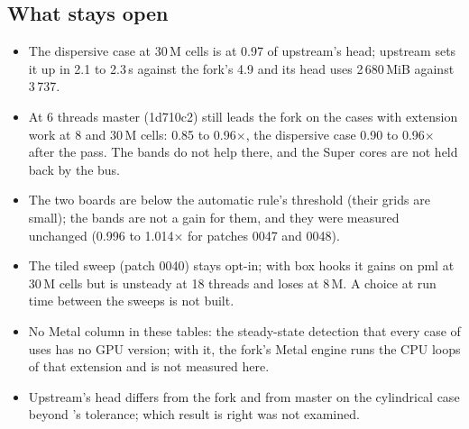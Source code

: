 \subsection{What stays open}
\begin{itemize}
\item The dispersive case at 30\,M cells is at 0.97 of upstream's head; upstream sets it up in 2.1 to 2.3\,s against the fork's 4.9 and its head
  uses 2\,680\,MiB against 3\,737.
\item At 6 threads master (1d710c2) still leads the fork on the cases with extension work at 8 and 30\,M cells: 0.85 to
  0.96$\times$, the dispersive case 0.90 to 0.96$\times$ after the pass. The bands do not help there, and the Super cores are not
  held back by the bus.
\item The two boards are below the automatic rule's threshold (their grids are small); the bands are not a gain for them, and
  they were measured unchanged (0.996 to 1.014$\times$ for patches 0047 and 0048).
\item The tiled sweep (patch 0040) stays opt-in; with box hooks it gains on pml at 30\,M cells but is unsteady at 18 threads and loses at 8\,M. A choice at run time between the sweeps is not built.
\item No Metal column in these tables: the steady-state detection that every case of  uses has no GPU version; with
  it, the fork's Metal engine runs the CPU loops of that extension and is not measured here.
\item Upstream's head differs from the fork and from master on the cylindrical case beyond 's tolerance;
  which result is right was not examined.
\end{itemize}
